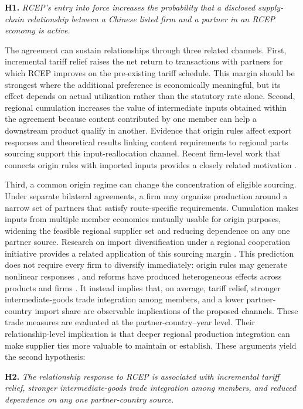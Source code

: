 \documentclass[preprint,12pt,authoryear]{elsarticle}
\begin{document}
\noindent\textbf{H1.} \textit{RCEP's entry into force increases the probability that a disclosed supply-chain relationship between a Chinese listed firm and a partner in an RCEP economy is active.}

The agreement can sustain relationships through three related channels. First, incremental tariff relief raises the net return to transactions with partners for which RCEP improves on the pre-existing tariff schedule. This margin should be strongest where the additional preference is economically meaningful, but its effect depends on actual utilization rather than the statutory rate alone. Second, regional cumulation increases the value of intermediate inputs obtained within the agreement because content contributed by one member can help a downstream product qualify in another. Evidence that origin rules affect export responses \citep{tanaka2022rooexports,hayakawa2023reform} and theoretical results linking content requirements to regional parts sourcing \citep{head2024laffer} support this input-reallocation channel. Recent firm-level work that connects origin rules with imported inputs provides a closely related motivation \citep{zhou2025origin}.

Third, a common origin regime can change the concentration of eligible sourcing. Under separate bilateral agreements, a firm may organize production around a narrow set of partners that satisfy route-specific requirements. Cumulation makes inputs from multiple member economies mutually usable for origin purposes, widening the feasible regional supplier set and reducing dependence on any one partner source. Research on import diversification under a regional cooperation initiative provides a related application of this sourcing margin \citep{zhu2025diversifying}. This prediction does not require every firm to diversify immediately: origin rules may generate nonlinear responses \citep{head2024laffer}, and reforms have produced heterogeneous effects across products and firms \citep{tanaka2022rooexports,hayakawa2023reform}. It instead implies that, on average, tariff relief, stronger intermediate-goods trade integration among members, and a lower partner-country import share are observable implications of the proposed channels. These trade measures are evaluated at the partner-country--year level. Their relationship-level implication is that deeper regional production integration can make supplier ties more valuable to maintain or establish. These arguments yield the second hypothesis:

\noindent\textbf{H2.} \textit{The relationship response to RCEP is associated with incremental tariff relief, stronger intermediate-goods trade integration among members, and reduced dependence on any one partner-country source.}
\end{document}
